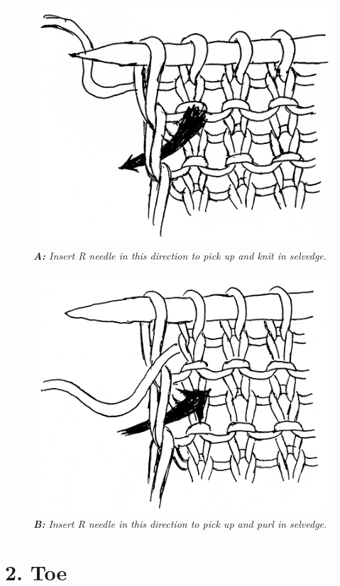\documentclass[12pt]{article}
\begin{document}
\begin{figure}
\includegraphics[width=\linewidth]{punk.png}
\emph{\small \textbf{A:} Insert R needle in this direction to pick up and knit in selvedge.}

\vspace{4em}
\includegraphics[width=\linewidth]{punp.png}
\emph{\small \textbf{B:} Insert R needle in this direction to pick up and purl in selvedge.}
\vspace{-6em}
\end{figure} \leavevmode

\section*{2. Toe}
\end{document}
